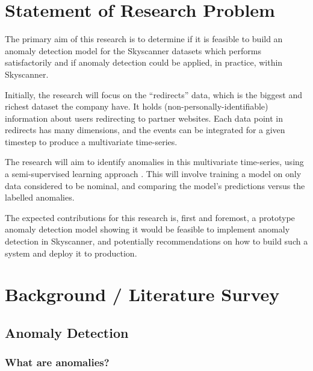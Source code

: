 \documentclass{mproj}
\begin{document}
\section{Statement of Research Problem}

The primary aim of this research is to determine if it is feasible to build an anomaly detection model for the Skyscanner datasets which performs satisfactorily and if anomaly detection could be applied, in practice, within Skyscanner.

Initially, the research will focus on the ``redirects'' data, which is the biggest and richest dataset the company have. It holds (non-personally-identifiable) information about users redirecting to partner websites. Each data point in redirects has many dimensions, and the events can be integrated for a given timestep to produce a multivariate time-series.

The research will aim to identify anomalies in this multivariate time-series, using a semi-supervised learning approach \citep{comparativeUnsupervisedEvaluation}. This will involve training a model on only data considered to be nominal, and comparing the model's predictions versus the labelled anomalies.

The expected contributions for this research is, first and foremost, a prototype anomaly detection model showing it would be feasible to implement anomaly detection in Skyscanner, and potentially recommendations on how to build such a system and deploy it to production.



\section{Background / Literature Survey}
\subsection{Anomaly Detection}

\subsubsection{What are anomalies?}
\end{document}
